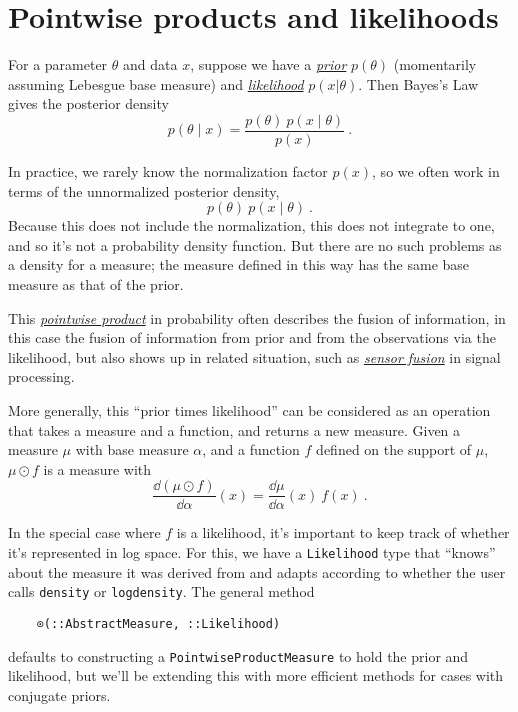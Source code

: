 \documentclass{juliacon}
\newcommand{\chad}[2][] {\todo[inline,backgroundcolor=orange!20!white, size=\footnotesize,#1]{(Chad) #2 }}
\newcommand{\moritz}[2][] {\todo[inline,backgroundcolor=blue!10!white, size=\footnotesize,#1]{(Moritz) #2 }}
\begin{document}


\section{Pointwise products and likelihoods \label{Likelihoods}}

For a parameter $\theta$ and data $x$, suppose we have a \href{https://en.wikipedia.org/wiki/Prior_probability}{\emph{prior}} $p(\theta)$ (momentarily assuming Lebesgue base measure) and \href{https://en.wikipedia.org/wiki/Likelihood_function}{\emph{likelihood}} $p(x | \theta)$. Then Bayes's Law gives the posterior density
\[
p(\theta \mid x) = \frac{p(\theta)\ p(x \mid \theta)}{p(x)}\ .
\]

In practice, we rarely know the normalization factor $p(x)$, so we often work in terms of the unnormalized posterior density,
\[
p(\theta)\ p(x \mid \theta)\ .
\]
Because this does not include the normalization, this does not integrate to one, and so it's not a probability density function. But there are no such problems as a density for a measure; the measure defined in this way has the same base measure as that of the prior.

This \href{https://en.wikipedia.org/wiki/Pointwise_product}{\emph{pointwise product}} in probability often describes the fusion of information, in this case the fusion of information from prior and from the observations via the likelihood, but also shows up in related situation, such as \href{https://en.wikipedia.org/wiki/Sensor_fusion}{\emph{sensor fusion}} in signal processing.

More generally, this ``prior times likelihood'' can be considered as an operation that takes a measure and a function, and returns a new measure. Given a measure $\mu$ with base measure $\alpha$, and a function $f$ defined on the support of $\mu$, $\mu \odot f$ is a measure with
\[
\frac{\dd (\mu \odot f)}{\dd \alpha}(x) = \frac{\dd\mu}{\dd\alpha}(x)\ f(x)\ .
\]

In the special case where $f$ is a likelihood, it's important to keep track of whether it's represented in log space. For this, we have a \verb|Likelihood| type that ``knows'' about the measure it was derived from and adapts according to whether the user calls \verb|density| or \verb|logdensity|. The general method
\begin{verbatim}
    ⊙(::AbstractMeasure, ::Likelihood)
\end{verbatim}
defaults to constructing a \verb|PointwiseProductMeasure| to hold the prior and likelihood, but we'll be extending this with more efficient methods for cases with conjugate priors. 
\end{document}
